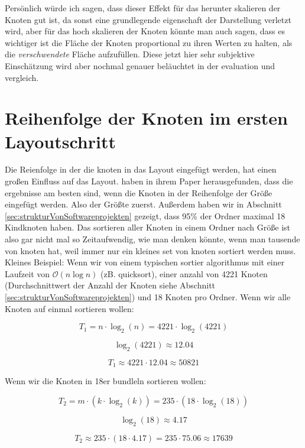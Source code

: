 Persönlich würde ich sagen, dass dieser Effekt für das herunter skalieren der Knoten gut ist, da sonst eine grundlegende eigenschaft der Darstellung verletzt wird, aber für das hoch skalieren der Knoten könnte man auch sagen, dass es wichtiger ist die Fläche der Knoten proportional zu ihren Werten zu halten, als die \textit{verschwendete} Fläche aufzufüllen. Diese jetzt hier sehr subjektive Einschätzung wird aber nochmal genauer beläuchtet in der evaluation und vergleich.

\section{Reihenfolge der Knoten im ersten Layoutschritt} \label{sec:ReihenfolgeKnoten}
Die Reienfolge in der die knoten in das Layout eingefügt werden, hat einen großen Einfluss auf das Layout. \cite{johnson1991tree} haben in ihrem Paper herausgefunden, dass die ergebnisse am besten sind, wenn die Knoten in der Reihenfolge der Größe eingefügt werden. Also der Größte zuerst.
Außerdem haben wir in Abschnitt \ref{sec:strukturVonSoftwareprojekten} gezeigt, dass 95\% der Ordner maximal 18 Kindknoten haben. Das sortieren aller Knoten in einem Ordner nach Größe ist also gar nicht mal so Zeitaufwendig, wie man denken könnte, wenn man tausende von knoten hat, weil immer nur ein kleines set von knoten sortiert werden muss. Kleines Beispiel:
Wenn wir von einem typischen sortier algorithmus mit einer Laufzeit von $\mathcal{O}(n\log n)$ (zB. quicksort), einer anzahl von 4221 Knoten (Durchschnittwert der Anzahl der Knoten siehe Abschnitt \ref{sec:strukturVonSoftwareprojekten}) und 18 Knoten pro Ordner. 
Wenn wir alle Knoten auf einmal sortieren wollen: 

\[
T_1 = n \cdot \log_2(n) = 4221 \cdot \log_2(4221)
\]

\[
\log_2(4221) \approx 12.04
\]

\[
T_1 \approx 4221 \cdot 12.04 \approx 50821
\]

Wenn wir die Knoten in 18er bundleln sortieren wollen: 

\[
T_2 = m \cdot \left(k \cdot \log_2(k)\right) = 235 \cdot \left(18 \cdot \log_2(18)\right)
\]

\[
\log_2(18) \approx 4.17
\]

\[
T_2 \approx 235 \cdot (18 \cdot 4.17) = 235 \cdot 75.06 \approx 17639
\]


